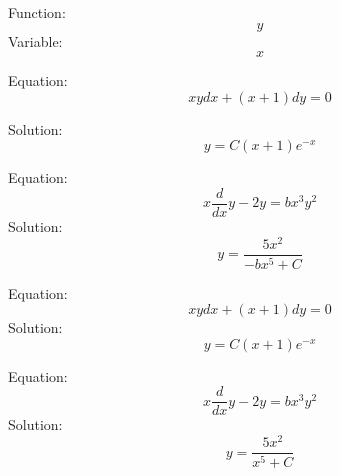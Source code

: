 \documentclass{article}
\begin{document}
Function:
$$
y
$$
Variable:
$$
x
$$

Equation:
$$
xydx+(x+1)dy=0
$$

Solution:
$$
y=C(x+1)e^{-x}
$$

Equation:
$$
x\frac{d}{dx}y-2y=bx^3y^2
$$
Solution:
$$
y = \frac{5x^2}{-bx^5+C}
$$



Equation:
$$
xydx+(x+1)dy=0
$$
Solution:
$$
y=C(x+1)e^{-x}
$$

Equation:
$$
x\frac{d}{dx}y-2y=bx^3y^2
$$
Solution:
$$
y = \frac{5x^2}{x^5+C}
$$
\end{document}
